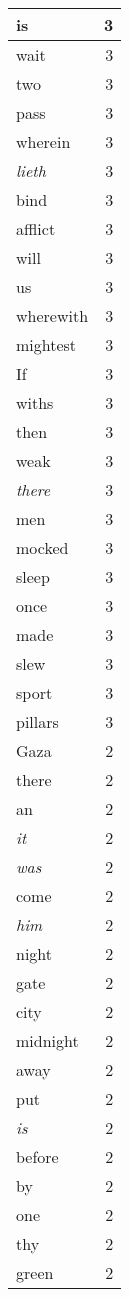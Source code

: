 \begin{center}
\begin{longtable}{l|r}
is & 3\\ \hline 
wait & 3\\ \hline 
two & 3\\ \hline 
pass & 3\\ \hline 
wherein & 3\\ \hline 
\emph{lieth} & 3\\ \hline 
bind & 3\\ \hline 
afflict & 3\\ \hline 
will & 3\\ \hline 
us & 3\\ \hline 
wherewith & 3\\ \hline 
mightest & 3\\ \hline 
If & 3\\ \hline 
withs & 3\\ \hline 
then & 3\\ \hline 
weak & 3\\ \hline 
\emph{there} & 3\\ \hline 
men & 3\\ \hline 
mocked & 3\\ \hline 
sleep & 3\\ \hline 
once & 3\\ \hline 
made & 3\\ \hline 
slew & 3\\ \hline 
sport & 3\\ \hline 
pillars & 3\\ \hline 
Gaza & 2\\ \hline 
there & 2\\ \hline 
an & 2\\ \hline 
\emph{it} & 2\\ \hline 
\emph{was} & 2\\ \hline 
come & 2\\ \hline 
\emph{him} & 2\\ \hline 
night & 2\\ \hline 
gate & 2\\ \hline 
city & 2\\ \hline 
midnight & 2\\ \hline 
away & 2\\ \hline 
put & 2\\ \hline 
\emph{is} & 2\\ \hline 
before & 2\\ \hline 
by & 2\\ \hline 
one & 2\\ \hline 
thy & 2\\ \hline 
green & 2\\ \hline 

\end{longtable}
\end{center}
